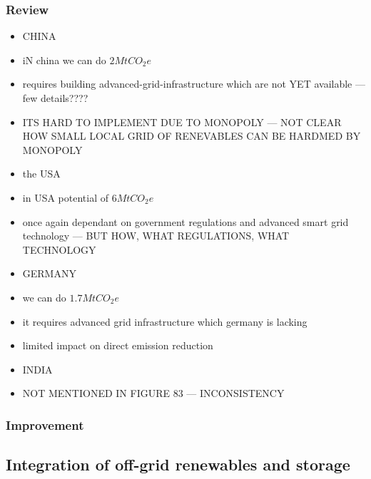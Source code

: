 \documentclass[11pt, twocolumn]{article}
\begin{document}
\subsubsection{Review}
\begin{itemize}
\item CHINA
\item iN china we can do $2 Mt CO_2e$
\item requires building advanced-grid-infrastructure which are not YET available --- few details????
\item ITS HARD TO IMPLEMENT DUE TO MONOPOLY --- NOT CLEAR HOW SMALL LOCAL GRID OF RENEVABLES CAN BE HARDMED BY MONOPOLY

\item the USA
\item in USA potential of $6 MtCO_2e$
\item once again dependant on government regulations and advanced smart grid technology --- BUT HOW, WHAT REGULATIONS, WHAT TECHNOLOGY

\item GERMANY
\item we can do $1.7 Mt CO_2e$

\item it requires advanced grid infrastructure which germany is lacking
\item limited impact on direct emission reduction


\item INDIA
\item NOT MENTIONED IN FIGURE 83 --- INCONSISTENCY

\end{itemize}
\subsubsection{Improvement}

\subsection{Integration of off-grid renewables and storage}
\end{document}
